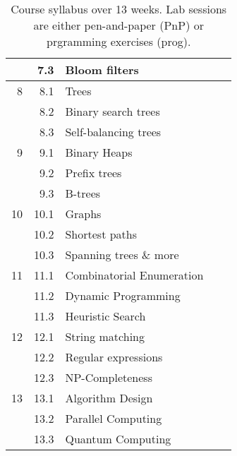 \begin{table}[p]
\begin{center}
\begin{tabular}{rrlll}
         & 7.3  & Bloom filters             &                     &      \\
    \midrule
    8    & 8.1  & Trees                     &                     &      \\
         & 8.2  & Binary search trees       &                     &      \\
         & 8.3  & Self-balancing trees      &                     &      \\
    9    & 9.1  & Binary Heaps              &                     &      \\
         & 9.2  & Prefix trees              &                     &      \\
         & 9.3  & B-trees                   &                     &      \\
    \midrule
    10   & 10.1 & Graphs                    &                     &      \\
         & 10.2 & Shortest paths            &                     &      \\
         & 10.3 & Spanning trees \& more    &                     &      \\
    \midrule
    11   & 11.1 & Combinatorial Enumeration &                     &      \\
         & 11.2 & Dynamic Programming       &                     &      \\
         & 11.3 & Heuristic Search          &                     &      \\
    \midrule
    12   & 12.1 & String matching           &                     &      \\
         & 12.2 & Regular expressions       &                     &      \\
         & 12.3 & NP-Completeness           &                     &      \\
    \midrule
    13   & 13.1 & Algorithm Design          &                     &      \\
         & 13.2 & Parallel Computing        &                     &      \\
         & 13.3 & Quantum Computing         &                     &      \\
    \bottomrule
  \end{tabular}
  \end{center}
  \caption{Course syllabus over 13 weeks. Lab sessions are either
    pen-and-paper (PnP) or prgramming exercises (prog).}
  \label{tab:syllabus}
\end{table}